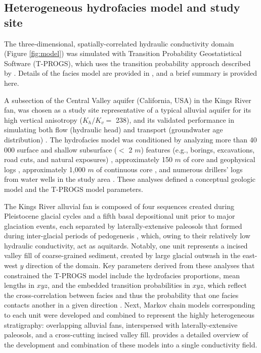 %
%
\subsection{Heterogeneous hydrofacies model and study site}
\label{ss_2_1}

The three‐dimensional, spatially-correlated hydraulic conductivity domain (Figure \ref{fig:model}) was simulated with Transition Probability Geostatistical Software (T-PROGS), which uses the transition probability approach described by \citet{carle1996transition, carle1997modeling, carle1999tprogs}. Details of the facies model are provided in \citet{weissmann1999three, weissmann1999multi, weissmann2002glacially, weissmann2004influence}, and a brief summary is provided here.

A subsection of the Central Valley aquifer (California, USA) in the Kings River fan, was chosen as a study site representative of a typical alluvial aquifer for its high vertical anisotropy ($K_h/K_v =$ 238), and its validated performance in simulating both flow (hydraulic head) and transport (groundwater age distribution) \citep{weissmann2002dispersion}. The hydrofacies model was conditioned by analyzing more than 40 000 surface and shallow subsurface ($<$ 2 $m$) features (e.g., borings, excavations, road cuts, and natural exposures) \citep{huntington1981soil}, approximately 150 $m$ of core and geophysical logs \citep{burow1997hydrogeologic}, approximately 1,000 $m$ of continuous core \citep{harter2005deep}, and numerous drillers' logs from water wells in the study area \citep{weissmann1999multi}. These analyses defined a conceptual geologic model and the T-PROGS model parameters. 

The Kings River alluvial fan is composed of four sequences created during Pleistocene glacial cycles and a fifth basal depositional unit prior to major glaciation events, each separated by laterally-extensive paleosols that formed during inter-glacial periods of pedogenesis \citep{weissmann2002glacially}, which, owing to their relatively low hydraulic conductivity, act as aquitards. Notably, one unit represents a incised valley fill of coarse-grained sediment, created by large glacial outwash in the east-west $y$ direction of the domain. Key parameters derived from these analyses that constrained the T-PROGS model include the hydrofacies proportions, mean lengths in $xyz$, and the embedded transition probabilities in $xyz$, which reflect the cross-correlation between facies and thus the probability that one facies contacts another in a given direction \citep{carle1996transition}. Next, Markov chain models corresponding to each unit were developed and combined to represent the highly heterogeneous stratigraphy: overlapping alluvial fans, interspersed with laterally-extensive paleosols, and a cross-cutting incised valley fill. \citet{weissmann2004influence} provides a detailed overview of the development and combination of these models into a single conductivity field. 


